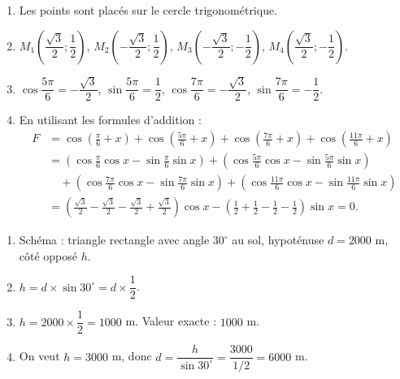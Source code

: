 \begin{enumerate}[label=\arabic*)]
\item Les points sont placés sur le cercle trigonométrique.
\item $M_1\left(\dfrac{\sqrt{3}}{2};\dfrac{1}{2}\right)$, $M_2\left(-\dfrac{\sqrt{3}}{2};\dfrac{1}{2}\right)$, $M_3\left(-\dfrac{\sqrt{3}}{2};-\dfrac{1}{2}\right)$, $M_4\left(\dfrac{\sqrt{3}}{2};-\dfrac{1}{2}\right)$.
\item $\cos\dfrac{5\pi}{6} = -\dfrac{\sqrt{3}}{2}$, $\sin\dfrac{5\pi}{6} = \dfrac{1}{2}$, $\cos\dfrac{7\pi}{6} = -\dfrac{\sqrt{3}}{2}$, $\sin\dfrac{7\pi}{6} = -\dfrac{1}{2}$.
\item En utilisant les formules d'addition :
\[
\begin{aligned}
F &= \cos\left(\frac{\pi}{6}+x\right) + \cos\left(\frac{5\pi}{6}+x\right) + \cos\left(\frac{7\pi}{6}+x\right) + \cos\left(\frac{11\pi}{6}+x\right) \\
&= \left(\cos\frac{\pi}{6}\cos x - \sin\frac{\pi}{6}\sin x\right) + \left(\cos\frac{5\pi}{6}\cos x - \sin\frac{5\pi}{6}\sin x\right) \\
&\quad + \left(\cos\frac{7\pi}{6}\cos x - \sin\frac{7\pi}{6}\sin x\right) + \left(\cos\frac{11\pi}{6}\cos x - \sin\frac{11\pi}{6}\sin x\right) \\
&= \left(\frac{\sqrt{3}}{2} - \frac{\sqrt{3}}{2} - \frac{\sqrt{3}}{2} + \frac{\sqrt{3}}{2}\right)\cos x - \left(\frac{1}{2} + \frac{1}{2} - \frac{1}{2} - \frac{1}{2}\right)\sin x = 0.
\end{aligned}
\]
\end{enumerate}

\begin{enumerate}[label=\arabic*)]
\item Schéma : triangle rectangle avec angle $30^\circ$ au sol, hypoténuse $d=2000$ m, côté opposé $h$.
\item $h = d \times \sin 30^\circ = d \times \dfrac{1}{2}$.
\item $h = 2000 \times \dfrac{1}{2} = 1000$ m. Valeur exacte : $1000$ m.
\item On veut $h=3000$ m, donc $d = \dfrac{h}{\sin 30^\circ} = \dfrac{3000}{1/2} = 6000$ m.
\end{enumerate}

